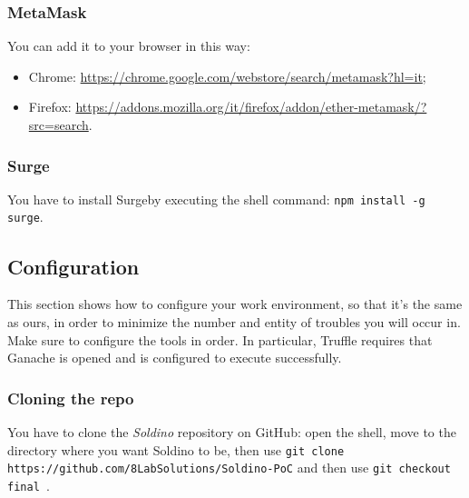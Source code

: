 \subsubsection{MetaMask}
You can add it to your browser in this way:
\begin{itemize}
	\item Chrome:  \href{https://chrome.google.com/webstore/search/metamask?hl=it}{https://chrome.google.com/webstore/search/metamask?hl=it};
	\item Firefox: \href{https://addons.mozilla.org/it/firefox/addon/ether-metamask/?src=search}{https://addons.mozilla.org/it/firefox/addon/ether-metamask/?src=search}.
\end{itemize}


\subsubsection{Surge}
You have to install Surge\glosp by executing the shell command: \texttt{npm install -g surge}.


\subsection{Configuration}
This section shows how to configure your work environment, so that it's the same as ours, in order to minimize the number and entity of troubles you will occur in.\\
Make sure to configure the tools in order. In particular, Truffle requires that Ganache is opened and is configured to execute successfully.
\subsubsection{Cloning the repo}
You have to clone the \textit{Soldino} repository on GitHub: open the shell, move to the directory where you want Soldino to be, then use \texttt{git clone https://github.com/8LabSolutions/Soldino-PoC} and then use \texttt{git checkout final
}.  

